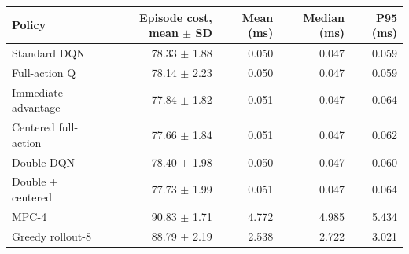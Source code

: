 \begin{tabular}{lrrrr}
\toprule
Policy & Episode cost, mean $\pm$ SD & Mean (ms) & Median (ms) & P95 (ms) \\
\midrule
Standard DQN & 78.33 $\pm$ 1.88 & 0.050 & 0.047 & 0.059 \\
Full-action Q & 78.14 $\pm$ 2.23 & 0.050 & 0.047 & 0.059 \\
Immediate advantage & 77.84 $\pm$ 1.82 & 0.051 & 0.047 & 0.064 \\
Centered full-action & 77.66 $\pm$ 1.84 & 0.051 & 0.047 & 0.062 \\
Double DQN & 78.40 $\pm$ 1.98 & 0.050 & 0.047 & 0.060 \\
Double + centered & 77.73 $\pm$ 1.99 & 0.051 & 0.047 & 0.064 \\
MPC-4 & 90.83 $\pm$ 1.71 & 4.772 & 4.985 & 5.434 \\
Greedy rollout-8 & 88.79 $\pm$ 2.19 & 2.538 & 2.722 & 3.021 \\
\bottomrule
\end{tabular}
